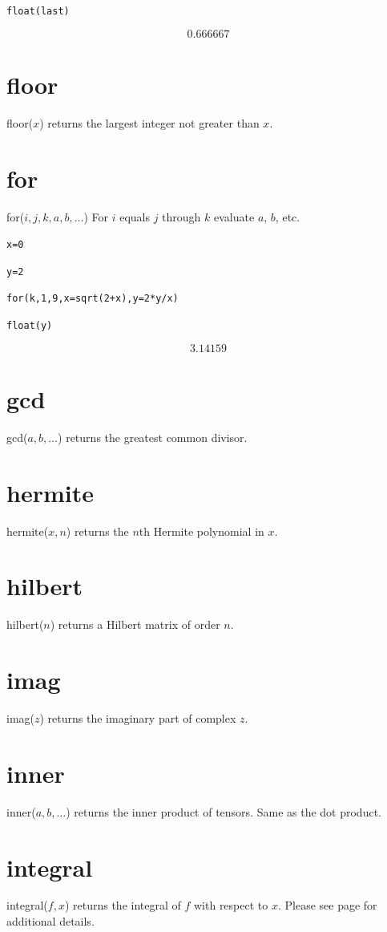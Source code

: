 \documentclass[12pt,openany]{report}
\begin{document}
{\tt float(last)}

$$0.666667$$

\section*{floor}
floor($x$) returns the largest integer not greater than $x$.

\section*{for}
for($i,j,k,a,b,\ldots$) For $i$ equals $j$ through $k$ evaluate $a$, $b$, etc.

\medskip
{\tt x=0}

{\tt y=2}

{\tt for(k,1,9,x=sqrt(2+x),y=2*y/x)}

{\tt float(y)}

$$3.14159$$

\section*{gcd}
gcd($a,b,\ldots$) returns the greatest common divisor.

\section*{hermite}
hermite($x,n$) returns the $n$th Hermite polynomial in $x$.

\section*{hilbert}
hilbert($n$) returns a Hilbert matrix of order $n$.

\section*{imag}
imag($z$) returns the imaginary part of complex $z$.

\section*{inner}
inner($a,b,\ldots$) returns the inner product of tensors.
Same as the dot product.

\section*{integral}
integral($f,x$) returns the integral of $f$ with respect to $x$.
Please see page \pageref{integral} for additional details.
\end{document}
